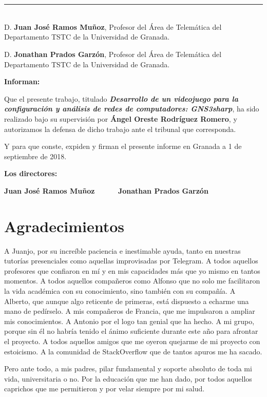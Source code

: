 \chapter*{}
\thispagestyle{empty}

\noindent\rule[-1ex]{\textwidth}{2pt}\\[4.5ex]

D. \textbf{Juan José Ramos Muñoz}, Profesor del Área de Telemática del Departamento TSTC de la Universidad de Granada.

\vspace{0.5cm}

D. \textbf{Jonathan Prados Garzón}, Profesor del Área de Telemática del Departamento TSTC de la Universidad de Granada.


\vspace{0.5cm}

\textbf{Informan:}

\vspace{0.5cm}

Que el presente trabajo, titulado \textit{\textbf{Desarrollo de un videojuego para la configuración y análisis de redes de computadores: GNS3sharp}},
ha sido realizado bajo su supervisión por \textbf{Ángel Oreste Rodríguez Romero}, y autorizamos la defensa de dicho trabajo ante el tribunal
que corresponda.

\vspace{0.5cm}

Y para que conste, expiden y firman el presente informe en Granada a 1 de septiembre de 2018.

\vspace{1cm}

\textbf{Los directores:}

\vspace{5cm}

\noindent \textbf{Juan José Ramos Muñoz \ \ \ \ \ Jonathan Prados Garzón}

\chapter*{Agradecimientos}
\thispagestyle{empty}

       \vspace{1cm}

A Juanjo, por su increíble paciencia e inestimable ayuda, tanto en nuestras tutorías presenciales como aquellas improvisadas por Telegram. A todos aquellos profesores que confiaron en mí y en mis capacidades más que yo mismo en tantos momentos. A todos aquellos compañeros como Alfonso que no solo me facilitaron la vida académica con su conocimiento, sino también con su compañía. A Alberto, que aunque algo reticente de primeras, está dispuesto a echarme una mano de pedírselo. A mis compañeros de Francia, que me impulsaron a ampliar mis conocimientos. A Antonio por el logo tan genial que ha hecho. A mi grupo, porque sin él no habría tenido el ánimo suficiente durante este año para afrontar el proyecto. A todos aquellos amigos que me oyeron quejarme de mi proyecto con estoicismo. A la comunidad de StackOverflow que de tantos apuros me ha sacado.

Pero ante todo, a mis padres, pilar fundamental y soporte absoluto de toda mi vida, universitaria o no. Por la educación que me han dado, por todos aquellos caprichos que me permitieron y por velar siempre por mi salud.